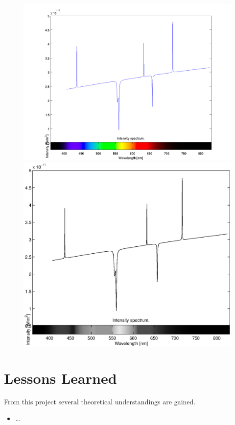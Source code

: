 \documentclass[10pt, a4paper]{article}
\begin{document}
\begin{figure}[hbt]
\begin{center}
\ifpdf
	\includegraphics[width=\linewidth]{../img/spectrum_wave.png}
\else
	\includegraphics[width=\linewidth]{../img/spectrum_wave.eps}
\fi
\end{center}
\caption{}
\label{fig+specwave}
\end{figure}
\clearpage



\section{Lessons Learned}
From this project several theoretical understandings are gained.
\begin{itemize}
	\item \ldots
\end{itemize}
\end{document}
